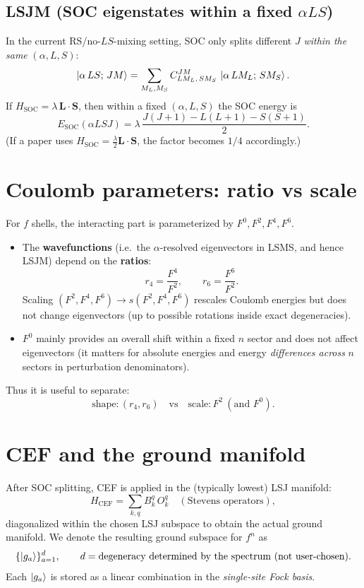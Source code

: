 \documentclass[11pt]{article}
\begin{document}
\subsection{LSJM (SOC eigenstates within a fixed $\alpha LS$)}
In the current RS/no-$LS$-mixing setting, SOC only splits different $J$ \emph{within the same} $(\alpha,L,S)$:
\begin{equation}
\ket{\alpha\,L S;\, J M} = \sum_{M_L,M_S} C^{JM}_{L M_L,\, S M_S}\,\ket{\alpha\,L M_L;\, S M_S}.
\end{equation}
If $H_{\text{SOC}}=\lambda\,\bm L\cdot \bm S$, then within a fixed $(\alpha,L,S)$ the SOC energy is
\begin{equation}
E_{\text{SOC}}(\alpha LSJ)=\lambda\,\frac{J(J+1)-L(L+1)-S(S+1)}{2}.
\end{equation}
(If a paper uses $H_{\text{SOC}}=\frac{\lambda}{2}\bm L\cdot\bm S$, the factor becomes $1/4$ accordingly.)

\section{Coulomb parameters: ratio vs scale}
For $f$ shells, the interacting part is parameterized by $F^0,F^2,F^4,F^6$.
\begin{itemize}[leftmargin=2em]
\item The \textbf{wavefunctions} (i.e.\ the $\alpha$-resolved eigenvectors in LSMS, and hence LSJM) depend on the \textbf{ratios}:
\[
r_4=\frac{F^4}{F^2},\qquad r_6=\frac{F^6}{F^2}.
\]
Scaling $(F^2,F^4,F^6)\to s(F^2,F^4,F^6)$ rescales Coulomb energies but does not change eigenvectors (up to possible rotations inside exact degeneracies).
\item $F^0$ mainly provides an overall shift within a fixed $n$ sector and does not affect eigenvectors (it matters for absolute energies and energy \emph{differences across} $n$ sectors in perturbation denominators).
\end{itemize}

Thus it is useful to separate:
\begin{equation}
\text{shape}:(r_4,r_6) \quad \text{vs}\quad \text{scale}:F^2\ (\text{and }F^0).
\end{equation}

\section{CEF and the ground manifold}
After SOC splitting, CEF is applied in the (typically lowest) LSJ manifold:
\begin{equation}
H_{\text{CEF}} = \sum_{k,q} B_k^q\, O_k^q \quad (\text{Stevens operators}),
\end{equation}
diagonalized within the chosen LSJ subspace to obtain the actual ground manifold.
We denote the resulting ground subspace for $f^n$ as
\begin{equation}
\{\ket{g_a}\}_{a=1}^d,\qquad d=\text{degeneracy determined by the spectrum (not user-chosen)}.
\end{equation}
Each $\ket{g_a}$ is stored as a linear combination in the \emph{single-site Fock basis}.
\end{document}
